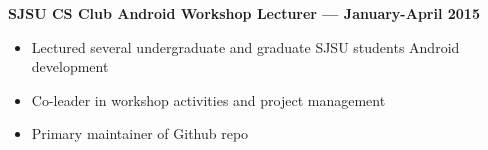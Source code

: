 \documentclass[10pt, oneside]{letter}
\begin{document}
        \textbf{SJSU CS Club Android Workshop Lecturer --- January-April 2015}
        \begin{adjustwidth}{0.2in}{0pt}
            \begin{itemize}
                \item Lectured several undergraduate and graduate SJSU students Android development
                \item Co-leader in workshop activities and project management
                \item Primary maintainer of Github repo
            \end{itemize}
        \end{adjustwidth}
\end{document}
